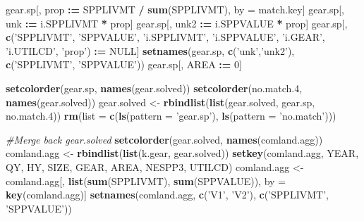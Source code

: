 \documentclass[]{article}
\newenvironment{Shaded}{\begin{snugshade}}{\end{snugshade}}
\newcommand{\KeywordTok}[1]{\textcolor[rgb]{0.13,0.29,0.53}{\textbf{#1}}}
\newcommand{\DataTypeTok}[1]{\textcolor[rgb]{0.13,0.29,0.53}{#1}}
\newcommand{\DecValTok}[1]{\textcolor[rgb]{0.00,0.00,0.81}{#1}}
\newcommand{\StringTok}[1]{\textcolor[rgb]{0.31,0.60,0.02}{#1}}
\newcommand{\CommentTok}[1]{\textcolor[rgb]{0.56,0.35,0.01}{\textit{#1}}}
\newcommand{\OtherTok}[1]{\textcolor[rgb]{0.56,0.35,0.01}{#1}}
\newcommand{\OperatorTok}[1]{\textcolor[rgb]{0.81,0.36,0.00}{\textbf{#1}}}
\newcommand{\ErrorTok}[1]{\textcolor[rgb]{0.64,0.00,0.00}{\textbf{#1}}}
\newcommand{\NormalTok}[1]{#1}
\begin{document}
\begin{Shaded}
\begin{Highlighting}[]
\NormalTok{  gear.sp[, prop }\OperatorTok{:}\ErrorTok{=}\StringTok{ }\NormalTok{SPPLIVMT }\OperatorTok{/}\StringTok{ }\KeywordTok{sum}\NormalTok{(SPPLIVMT), by =}\StringTok{ }\NormalTok{match.key]}
\NormalTok{  gear.sp[, unk  }\OperatorTok{:}\ErrorTok{=}\StringTok{ }\NormalTok{i.SPPLIVMT }\OperatorTok{*}\StringTok{ }\NormalTok{prop]}
\NormalTok{  gear.sp[, unk2 }\OperatorTok{:}\ErrorTok{=}\StringTok{ }\NormalTok{i.SPPVALUE }\OperatorTok{*}\StringTok{ }\NormalTok{prop]}
\NormalTok{  gear.sp[, }\KeywordTok{c}\NormalTok{(}\StringTok{'SPPLIVMT'}\NormalTok{, }\StringTok{'SPPVALUE'}\NormalTok{, }\StringTok{'i.SPPLIVMT'}\NormalTok{, }\StringTok{'i.SPPVALUE'}\NormalTok{, }\StringTok{'i.GEAR'}\NormalTok{, }
              \StringTok{'i.UTILCD'}\NormalTok{, }\StringTok{'prop'}\NormalTok{) }\OperatorTok{:}\ErrorTok{=}\StringTok{ }\OtherTok{NULL}\NormalTok{]}
  \KeywordTok{setnames}\NormalTok{(gear.sp, }\KeywordTok{c}\NormalTok{(}\StringTok{'unk'}\NormalTok{,}\StringTok{'unk2'}\NormalTok{), }\KeywordTok{c}\NormalTok{(}\StringTok{'SPPLIVMT'}\NormalTok{, }\StringTok{'SPPVALUE'}\NormalTok{))}
\NormalTok{  gear.sp[, AREA }\OperatorTok{:}\ErrorTok{=}\StringTok{ }\DecValTok{0}\NormalTok{]}
  
  \KeywordTok{setcolorder}\NormalTok{(gear.sp,    }\KeywordTok{names}\NormalTok{(gear.solved))}
  \KeywordTok{setcolorder}\NormalTok{(no.match.}\DecValTok{4}\NormalTok{, }\KeywordTok{names}\NormalTok{(gear.solved))}
\NormalTok{  gear.solved <-}\StringTok{ }\KeywordTok{rbindlist}\NormalTok{(}\KeywordTok{list}\NormalTok{(gear.solved, gear.sp, no.match.}\DecValTok{4}\NormalTok{))}
  \KeywordTok{rm}\NormalTok{(}\DataTypeTok{list =} \KeywordTok{c}\NormalTok{(}\KeywordTok{ls}\NormalTok{(}\DataTypeTok{pattern =} \StringTok{'gear.sp'}\NormalTok{), }\KeywordTok{ls}\NormalTok{(}\DataTypeTok{pattern =} \StringTok{'no.match'}\NormalTok{)))}
  
  \CommentTok{#Merge back gear.solved}
  \KeywordTok{setcolorder}\NormalTok{(gear.solved, }\KeywordTok{names}\NormalTok{(comland.agg))}
\NormalTok{  comland.agg <-}\StringTok{ }\KeywordTok{rbindlist}\NormalTok{(}\KeywordTok{list}\NormalTok{(k.gear, gear.solved))}
  \KeywordTok{setkey}\NormalTok{(comland.agg,}
\NormalTok{         YEAR,}
\NormalTok{         QY,}
\NormalTok{         HY,}
\NormalTok{         SIZE,}
\NormalTok{         GEAR,}
\NormalTok{         AREA,}
\NormalTok{         NESPP3,}
\NormalTok{         UTILCD)}
\NormalTok{  comland.agg <-}\StringTok{ }\NormalTok{comland.agg[, }\KeywordTok{list}\NormalTok{(}\KeywordTok{sum}\NormalTok{(SPPLIVMT), }\KeywordTok{sum}\NormalTok{(SPPVALUE)), }
\NormalTok{                             by =}\StringTok{ }\KeywordTok{key}\NormalTok{(comland.agg)]}
  \KeywordTok{setnames}\NormalTok{(comland.agg, }\KeywordTok{c}\NormalTok{(}\StringTok{'V1'}\NormalTok{, }\StringTok{'V2'}\NormalTok{), }\KeywordTok{c}\NormalTok{(}\StringTok{'SPPLIVMT'}\NormalTok{, }\StringTok{'SPPVALUE'}\NormalTok{))}
    

\end{Highlighting}
\end{Shaded}
\end{document}

